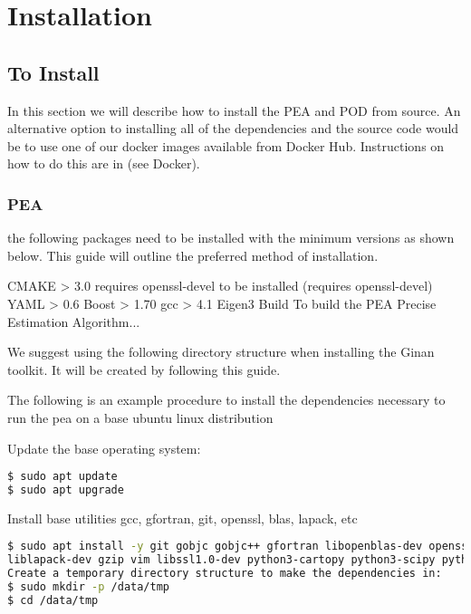 \chapter{Installation}
\label{ch:installation}


\section{To Install} 

In this section we will describe how to install the PEA and POD from source. An alternative option to installing all of the dependencies and the source code would be to use one of our docker images available from Docker Hub. Instructions on how to do this are in (see Docker).

\subsection{PEA}


 the following packages need to be installed with the minimum versions as shown below. This guide will outline the preferred method of installation.

CMAKE  > 3.0 requires openssl-devel to be installed (requires openssl-devel)
YAML   > 0.6
Boost  > 1.70
gcc    > 4.1
Eigen3
Build
To build the PEA Precise Estimation Algorithm...

We suggest using the following directory structure when installing the Ginan toolkit. It will be created by following this guide.


The following is an example procedure to install the dependencies necessary to run the pea on a base ubuntu linux distribution

Update the base operating system:

\begin{lstlisting}[language=bash]
$ sudo apt update
$ sudo apt upgrade
\end{lstlisting}

Install base utilities gcc, gfortran, git, openssl, blas, lapack, etc
\begin{lstlisting}[language=bash]
$ sudo apt install -y git gobjc gobjc++ gfortran libopenblas-dev openssl curl net-tools openssh-server cmake make \
liblapack-dev gzip vim libssl1.0-dev python3-cartopy python3-scipy python3-matplotlib python3-mpltoolkits.basemap
Create a temporary directory structure to make the dependencies in:
$ sudo mkdir -p /data/tmp
$ cd /data/tmp
\end{lstlisting}

